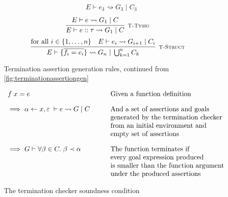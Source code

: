 \begin{figure}
\[{\begin{array}{c}
                \hspace{1em}
                E \vdash e_3 \rightsquigarrow G_3\; |\; C_3
            \end{array}
        }
    \]
    \vspace{10pt}
    \[
        \infer[\textsc{\footnotesize T-Tysig}]{
            E \vdash e :: \tau
                \rightsquigarrow G_1\; |\; C
        }{
            E \vdash e \rightsquigarrow G_1\; |\; C
        }
    \]
    \vspace{10pt}
    \[
        \infer[\textsc{\footnotesize T-Struct}]{
            E \vdash \{\overline{f_i = e_i}\}
                \rightsquigarrow G_{n}\; |\; \bigcup_{k = 1}^n C_k
        }{
           \text{for all } i \in \{1, \dots, n\}\quad  E \vdash e_i 
                \rightsquigarrow G_{i+1}\; |\; C_i
        }
    \]
    
    \caption{Termination assertion generation rules,
             continued from \autoref{fig:terminationassertiongen}}
    \label{fig:terminationassertiongen2}
\end{figure}


\begin{figure}
    \centering
    \[
        \begin{array}{ll}
            f\; x = e              
                & \text{Given a function definition} \\[10pt]
            \implies \alpha \leftarrow x,\varepsilon\; 
                \vdash e \rightsquigarrow G\; |\; C
                \hspace{2em}
                & \text{And a set of assertions and goals} \\
                & \text{generated by the termination checker} \\
                & \text{from an initial environment and} \\
                & \text{empty set of assertions} \\[10pt]
            \implies G \vdash \forall \beta \in C.\; \beta \prec \alpha
                & \text{The function terminates if} \\
                & \text{every goal expression produced} \\
                & \text{is smaller than the function argument} \\
                & \text{under the produced assertions}
        \end{array}
    \]
    
    \caption{The termination checker soundness condition}
    \label{fig:terminationcondition}
\end{figure}

